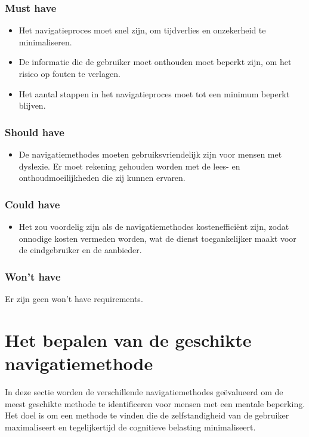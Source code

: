 \subsubsection{Must have}
\begin{itemize}
    \item Het navigatieproces moet snel zijn, om tijdverlies en onzekerheid te minimaliseren.
    \item De informatie die de gebruiker moet onthouden moet beperkt zijn, om het risico op fouten te verlagen.
    \item Het aantal stappen in het navigatieproces moet tot een minimum beperkt blijven.
\end{itemize}

\subsubsection{Should have}
\begin{itemize}
    \item De navigatiemethodes moeten gebruiksvriendelijk zijn voor mensen met dyslexie. Er moet rekening gehouden worden met de lees- en onthoudmoeilijkheden die zij kunnen ervaren.
\end{itemize}

\subsubsection{Could have}
\begin{itemize}
    \item Het zou voordelig zijn als de navigatiemethodes kostenefficiënt zijn, zodat onnodige kosten vermeden worden, wat de dienst toegankelijker maakt voor de eindgebruiker en de aanbieder.
\end{itemize}

\subsubsection{Won't have}

Er zijn geen won't have requirements.

\section{Het bepalen van de geschikte navigatiemethode}
\label{sec:bepalen-geschikte-navigatiemethode}

In deze sectie worden de verschillende navigatiemethodes geëvalueerd om de meest geschikte methode te identificeren voor mensen met een mentale beperking. Het doel is om een methode te vinden die de zelfstandigheid van de gebruiker maximaliseert en tegelijkertijd de cognitieve belasting minimaliseert.

